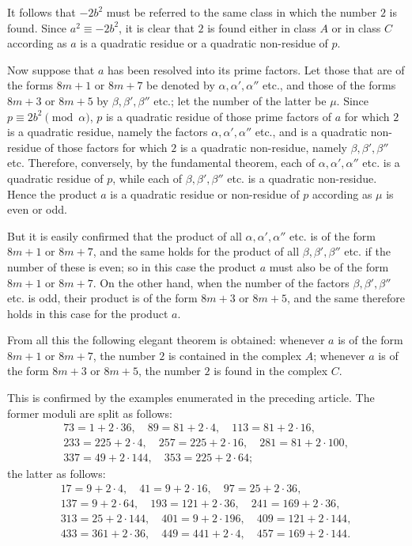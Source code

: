 \documentclass[12pt]{article}
\begin{document}
It follows that $-2b^2$ must be referred to the same class in which the number $2$ is found. Since $a^2\equiv -2b^2$, it is clear that $2$ is found either in class $A$ or in class $C$ according as $a$ is a quadratic residue or a quadratic non-residue of $p$.

Now suppose that $a$ has been resolved into its prime factors. Let those that are of the forms $8m+1$ or $8m+7$ be denoted by $\alpha,\alpha',\alpha''$ etc., and those of the forms $8m+3$ or $8m+5$ by $\beta,\beta',\beta''$ etc.; let the number of the latter be $\mu$. Since $p\equiv 2b^2\pmod \alpha$, $p$ is a quadratic residue of those prime factors of $a$ for which $2$ is a quadratic residue, namely the factors $\alpha,\alpha',\alpha''$ etc., and is a quadratic non-residue of those factors for which $2$ is a quadratic non-residue, namely $\beta,\beta',\beta''$ etc. Therefore, conversely, by the fundamental theorem, each of $\alpha,\alpha',\alpha''$ etc. is a quadratic residue of $p$, while each of $\beta,\beta',\beta''$ etc. is a quadratic non-residue. Hence the product $a$ is a quadratic residue or non-residue of $p$ according as $\mu$ is even or odd.

But it is easily confirmed that the product of all $\alpha,\alpha',\alpha''$ etc. is of the form $8m+1$ or $8m+7$, and the same holds for the product of all $\beta,\beta',\beta''$ etc. if the number of these is even; so in this case the product $a$ must also be of the form $8m+1$ or $8m+7$. On the other hand, when the number of the factors $\beta,\beta',\beta''$ etc. is odd, their product is of the form $8m+3$ or $8m+5$, and the same therefore holds in this case for the product $a$.

From all this the following elegant theorem is obtained: whenever $a$ is of the form $8m+1$ or $8m+7$, the number $2$ is contained in the complex $A$; whenever $a$ is of the form $8m+3$ or $8m+5$, the number $2$ is found in the complex $C$.

This is confirmed by the examples enumerated in the preceding article. The former moduli are split as follows:
\[
\begin{gathered}
73=1+2\cdot36,\quad 89=81+2\cdot4,\quad 113=81+2\cdot16,\\
233=225+2\cdot4,\quad 257=225+2\cdot16,\quad 281=81+2\cdot100,\\
337=49+2\cdot144,\quad 353=225+2\cdot64;
\end{gathered}
\]
the latter as follows:
\[
\begin{gathered}
17=9+2\cdot4,\quad 41=9+2\cdot16,\quad 97=25+2\cdot36,\\
137=9+2\cdot64,\quad 193=121+2\cdot36,\quad 241=169+2\cdot36,\\
313=25+2\cdot144,\quad 401=9+2\cdot196,\quad 409=121+2\cdot144,\\
433=361+2\cdot36,\quad 449=441+2\cdot4,\quad 457=169+2\cdot144.
\end{gathered}
\]
\end{document}
